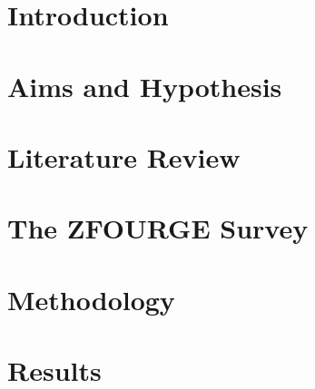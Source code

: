 \documentclass[openany]{book}
\begin{document}
\frontmatter

\pagestyle{fancy}
\fancyhead[RO,LE]{\thepage}
\fancyhead[RE]{\nouppercase{\leftmark}}
\fancyhead[LO]{\nouppercase{\rightmark}}
\fancyfoot{} 




 




\renewcommand*\contentsname{Table of Contents}
\tableofcontents


\mainmatter
\chapter{Introduction}


\chapter{Aims and Hypothesis}


\chapter{Literature Review}



\chapter{The ZFOURGE Survey}


\chapter{Methodology}




\chapter{Results}


\end{document}
